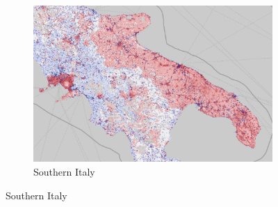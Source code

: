             \begin{figure}[H]
                \begin{subfigure}[t]{\textwidth}
                    \centering
                    \includegraphics[width=\linewidth,height=0.5\linewidth]{figs_06/osm_vs_cop_italy.png}
                    \caption{Southern Italy}
                    \label{fig:osm_vs_cop_italy}
                \end{subfigure}
                
                \vspace{1em} %
                

\end{figure}
